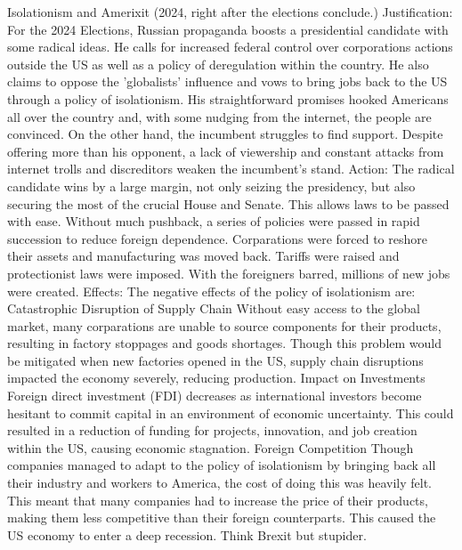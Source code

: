     Isolationism and Amerixit (2024, right after the elections conclude.)
        Justification:
            For the 2024 Elections, Russian propaganda boosts a presidential candidate with some radical ideas. He calls for increased federal control over corporations actions outside the US as well as a policy of deregulation within the country. He also claims to oppose the 'globalists' influence and vows to bring jobs back to the US through a policy of isolationism.
            His straightforward promises hooked Americans all over the country and, with some nudging from the internet, the people are convinced.
            On the other hand, the incumbent struggles to find support. Despite offering more than his opponent, a lack of viewership and constant attacks from internet trolls and discreditors weaken the incumbent's stand.
        Action:
            The radical candidate wins by a large margin, not only seizing the presidency, but also securing the most of the crucial House and Senate. This allows laws to be passed with ease.
            Without much pushback, a series of policies were passed in rapid succession to reduce foreign dependence. Corparations were forced to reshore their assets and manufacturing was moved back. Tariffs were raised and protectionist laws were imposed. With the foreigners barred, millions of new jobs were created.
        Effects:
            The negative effects of the policy of isolationism are:
                Catastrophic Disruption of Supply Chain
                Without easy access to the global market, many corparations are unable to source components for their products, resulting in factory stoppages and goods shortages. Though this problem would be mitigated when new factories opened in the US, supply chain disruptions impacted the economy severely, reducing production.
                Impact on Investments
                Foreign direct investment (FDI) decreases as international investors become hesitant to commit capital in an environment of economic uncertainty. This could resulted in a reduction of funding for projects, innovation, and job creation within the US, causing economic stagnation.
                Foreign Competition
                Though companies managed to adapt to the policy of isolationism by bringing back all their industry and workers to America, the cost of doing this was heavily felt. This meant that many companies had to increase the price of their products, making them less competitive than their foreign counterparts.
            This caused the US economy to enter a deep recession. Think Brexit but stupider.

